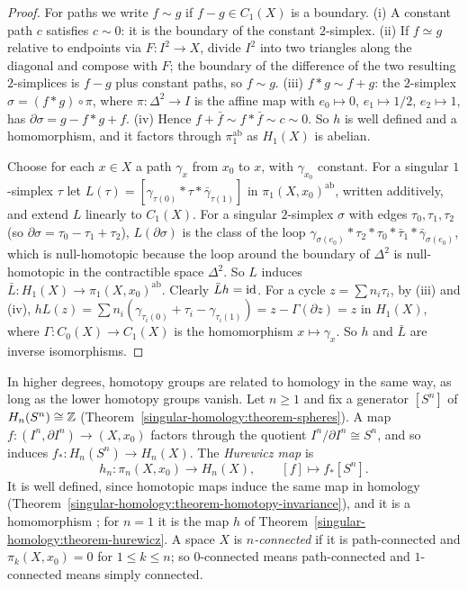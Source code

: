 \begin{proof}
For paths we write $f \sim g$ if $f - g \in C_1(X)$ is a boundary. (i) A constant path $c$ satisfies $c \sim 0$: it is the boundary of the constant $2$-simplex.
(ii) If $f \simeq g$ relative to endpoints via $F \colon I^2 \to X$, divide $I^2$ into two triangles along the diagonal and compose with $F$; the boundary of the
difference of the two resulting $2$-simplices is $f - g$ plus constant paths, so $f \sim g$. (iii) $f * g \sim f + g$: the $2$-simplex $\sigma = (f * g) \circ \pi$, where
$\pi \colon \Delta^2 \to I$ is the affine map with $e_0 \mapsto 0$, $e_1 \mapsto 1/2$, $e_2 \mapsto 1$, has $\partial\sigma = g - f * g + f$. (iv) Hence
$f + \bar f \sim f * \bar f \sim c \sim 0$. So $h$ is well defined and a homomorphism, and it factors through $\pi_1^{\mathrm{ab}}$ as $H_1(X)$ is abelian.

Choose for each $x \in X$ a path $\gamma_x$ from $x_0$ to $x$, with $\gamma_{x_0}$ constant. For a singular $1$-simplex $\tau$ let $L(\tau) = [\gamma_{\tau(0)} * \tau * \bar\gamma_{\tau(1)}]$
in $\pi_1(X, x_0)^{\mathrm{ab}}$, written additively, and extend $L$ linearly to $C_1(X)$. For a singular $2$-simplex $\sigma$ with edges $\tau_0, \tau_1, \tau_2$ (so
$\partial\sigma = \tau_0 - \tau_1 + \tau_2$), $L(\partial\sigma)$ is the class of the loop $\gamma_{\sigma(e_0)} * \tau_2 * \tau_0 * \bar\tau_1 * \bar\gamma_{\sigma(e_0)}$, which is
null-homotopic because the loop around the boundary of $\Delta^2$ is null-homotopic in the contractible space $\Delta^2$. So $L$ induces
$\bar L \colon H_1(X) \to \pi_1(X, x_0)^{\mathrm{ab}}$. Clearly $\bar L h = \mathrm{id}$. For a cycle $z = \sum n_i\tau_i$, by (iii) and (iv),
$hL(z) = \sum n_i(\gamma_{\tau_i(0)} + \tau_i - \gamma_{\tau_i(1)}) = z - \Gamma(\partial z) = z$ in $H_1(X)$, where $\Gamma \colon C_0(X) \to C_1(X)$ is the homomorphism $x \mapsto \gamma_x$.
So $h$ and $\bar L$ are inverse isomorphisms.
\end{proof}

In higher degrees, homotopy groups are related to homology in the same way, as long as the lower homotopy groups vanish. Let $n \geq 1$ and fix a generator $[S^n]$ of
$H_n(S^n) \cong \mathbb{Z}$ (Theorem~\ref{singular-homology:theorem-spheres}). A map $f \colon (I^n, \partial I^n) \to (X, x_0)$ factors through the quotient $I^n/\partial I^n \cong S^n$, and so
induces $f_* \colon H_n(S^n) \to H_n(X)$. The \emph{Hurewicz map} is
\[
h_n \colon \pi_n(X, x_0) \to H_n(X), \qquad [f] \mapsto f_*[S^n] .
\]
It is well defined, since homotopic maps induce the same map in homology (Theorem~\ref{singular-homology:theorem-homotopy-invariance}), and it is a homomorphism \cite[Section 4.2]{hatcher-at}; for $n = 1$ it is the map $h$ of
Theorem~\ref{singular-homology:theorem-hurewicz}. A space $X$ is \emph{$n$-connected} if it is path-connected and $\pi_k(X, x_0) = 0$ for $1 \leq k \leq n$; so $0$-connected means
path-connected and $1$-connected means simply connected.

